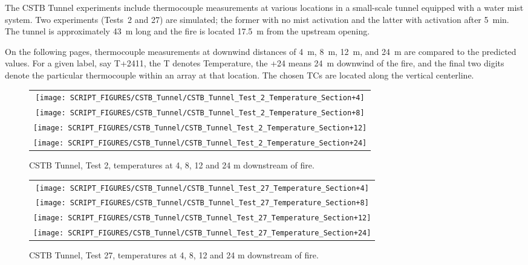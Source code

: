 The CSTB Tunnel experiments include thermocouple measurements at various locations in a small-scale tunnel equipped with a water mist system. Two experiments (Tests~2 and 27) are simulated; the former with no mist activation and the latter with activation after 5~min. The tunnel is approximately 43~m long and the fire is located 17.5~m from the upstream opening.

On the following pages, thermocouple measurements at downwind distances of 4~m, 8~m, 12~m, and 24~m are compared to the predicted values. For a given label, say T+2411, the T denotes Temperature, the +24 means 24~m downwind of the fire, and the final two digits denote the particular thermocouple within an array at that location. The chosen TCs are located along the vertical centerline.

\begin{figure}[!ht]
\begin{tabular*}{\textwidth}{c}
\texttt{[image: SCRIPT\_FIGURES/CSTB\_Tunnel/CSTB\_Tunnel\_Test\_2\_Temperature\_Section+4]}  \\
\texttt{[image: SCRIPT\_FIGURES/CSTB\_Tunnel/CSTB\_Tunnel\_Test\_2\_Temperature\_Section+8]}  \\
\texttt{[image: SCRIPT\_FIGURES/CSTB\_Tunnel/CSTB\_Tunnel\_Test\_2\_Temperature\_Section+12]} \\
\texttt{[image: SCRIPT\_FIGURES/CSTB\_Tunnel/CSTB\_Tunnel\_Test\_2\_Temperature\_Section+24]}
\end{tabular*}
\caption[CSTB Tunnel, Test 2, temperatures at 4, 8, 12 and 24 m downstream of fire]
{CSTB Tunnel, Test 2, temperatures at 4, 8, 12 and 24 m downstream of fire.}
\label{CSTB_Tunnel_1}
\end{figure}

\begin{figure}[!ht]
\begin{tabular*}{\textwidth}{c}
\texttt{[image: SCRIPT\_FIGURES/CSTB\_Tunnel/CSTB\_Tunnel\_Test\_27\_Temperature\_Section+4]}  \\
\texttt{[image: SCRIPT\_FIGURES/CSTB\_Tunnel/CSTB\_Tunnel\_Test\_27\_Temperature\_Section+8]}  \\
\texttt{[image: SCRIPT\_FIGURES/CSTB\_Tunnel/CSTB\_Tunnel\_Test\_27\_Temperature\_Section+12]} \\
\texttt{[image: SCRIPT\_FIGURES/CSTB\_Tunnel/CSTB\_Tunnel\_Test\_27\_Temperature\_Section+24]}
\end{tabular*}
\caption[CSTB Tunnel, Test 27, temperatures at 4, 8, 12 and 24 m downstream of fire]
{CSTB Tunnel, Test 27, temperatures at 4, 8, 12 and 24 m downstream of fire.}
\label{CSTB_Tunnel_2}
\end{figure}


